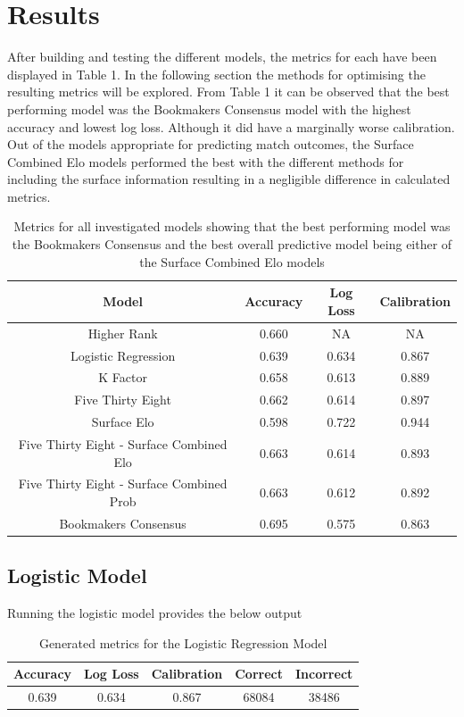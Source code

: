 \documentclass[12pt,a4paper]{article}
\begin{document}
\section{Results}
After building and testing the different models, the metrics for each have been displayed
in Table 1. In the following section the methods for optimising the resulting metrics
will be explored. From Table 1 it can be observed that the best performing model was the
Bookmakers Consensus model with the highest accuracy and lowest log loss. Although it did
have a marginally worse calibration. Out of the models appropriate for predicting match
outcomes, the Surface Combined Elo models performed the best with the different methods for
including the surface information resulting in a negligible difference in calculated metrics.
\begin{table}[h]
  \begin{tabular}{||c c c c||}
    \hline
    Model                                     & Accuracy & Log Loss & Calibration \\
    \hline\hline
    Higher Rank                               & 0.660    & NA       & NA          \\
    Logistic Regression                       & 0.639    & 0.634    & 0.867       \\
    K Factor                                  & 0.658    & 0.613    & 0.889       \\
    Five Thirty Eight                         & 0.662    & 0.614    & 0.897       \\
    Surface Elo                               & 0.598    & 0.722    & 0.944       \\
    Five Thirty Eight - Surface Combined Elo  & 0.663    & 0.614    & 0.893       \\
    Five Thirty Eight - Surface Combined Prob & 0.663    & 0.612    & 0.892       \\
    Bookmakers Consensus                      & 0.695    & 0.575    & 0.863       \\
    \hline
  \end{tabular}
  \caption{Metrics for all investigated models showing that the best performing model was
    the Bookmakers Consensus and the best overall predictive model being either of the
    Surface Combined Elo models}
\end{table}
\subsection{Logistic Model}
Running the logistic model provides the below output
\begin{table}[h]
  \centering
  \begin{tabular}{||c c c c c||}
    \hline
    Accuracy & Log Loss & Calibration & Correct & Incorrect \\
    \hline\hline
    0.639    & 0.634    & 0.867       & 68084   & 38486     \\
    \hline
  \end{tabular}
  \caption{Generated metrics for the Logistic Regression Model}
\end{table}
\end{document}
